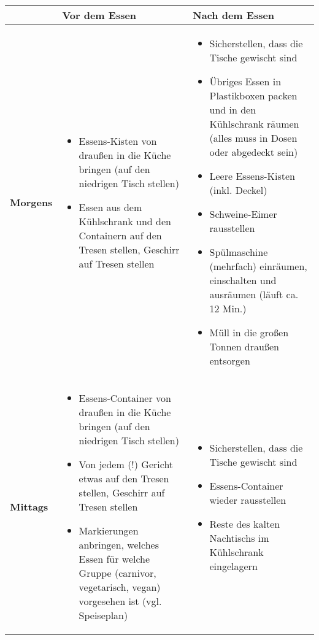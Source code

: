 \documentclass[a4paper,parskip=half]{scrartcl}
\begin{document}
\small
\renewcommand{\arraystretch}{1}
\begin{tabularx}{\textwidth}{l||p{}|X}
    & \textbf{Vor dem Essen} & \textbf{Nach dem Essen} \\
    \hline
    \hline
    \newline\textbf{Morgens}&%
        \begin{itemize}
            \item Essens-Kisten von draußen in die Küche bringen (auf den niedrigen Tisch stellen)
            \item Essen aus dem Kühlschrank und den Containern auf den Tresen stellen, Geschirr auf Tresen stellen
        \end{itemize}&%
        \begin{itemize}
            \item Sicherstellen, dass die Tische gewischt sind
            \item Übriges Essen in Plastikboxen packen und in den Kühlschrank räumen (alles muss in Dosen oder abgedeckt sein)
            \item Leere Essens-Kisten (inkl. Deckel)
            \item Schweine-Eimer rausstellen
            \item Spülmaschine (mehrfach) einräumen, einschalten und ausräumen (läuft ca. 12 Min.)
            \item Müll in die großen Tonnen draußen entsorgen
        \end{itemize}\\
    \hline
    \newline\textbf{Mittags} &
        \begin{itemize}
            \item Essens-Container von draußen in die Küche bringen (auf den niedrigen Tisch stellen)
            \item Von jedem (!) Gericht etwas auf den Tresen stellen, Geschirr auf Tresen stellen
            \item Markierungen anbringen, welches Essen für welche Gruppe (carnivor, vegetarisch, vegan) vorgesehen ist (vgl. Speiseplan)
        \end{itemize} &
        \begin{itemize}
            \item Sicherstellen, dass die Tische gewischt sind
            \item Essens-Container wieder rausstellen
			\item Reste des kalten Nachtischs im Kühlschrank eingelagern

\end{itemize}
\end{tabularx}
\end{document}
